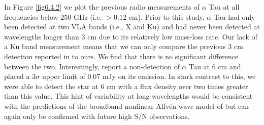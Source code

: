 In Figure \ref{fig6.4.2} we plot the previous  radio measurements of $\alpha$ Tau at all frequencies below 250 GHz (i.e. $> 0.12$ cm). Prior to this study, $\alpha$ Tau had only been detected at two VLA bands (i.e., X and Ku) and had never been detected at wavelengths longer than 3 cm due to its relatively low mass-loss rate. Our lack of a Ku band measurement means that we can only compare the previous 3 cm detection reported in \cite{wood_2007} to ours. We find that there is no significant difference between the two. Interestingly, \cite{wood_2007} report a non-detection of $\alpha$ Tau at 6 cm and placed a 3$\sigma$ upper limit of 0.07 mJy on its emission. In stark contrast to this, we were able to detect the star at 6 cm with a flux density over two times greater than this value. This hint of variability at long wavelengths would be consistent with the predictions of the broadband nonlinear Alfv\'{e}n wave model of \cite{airapetian_2010} but can again only be confirmed with future high S/N observations.

